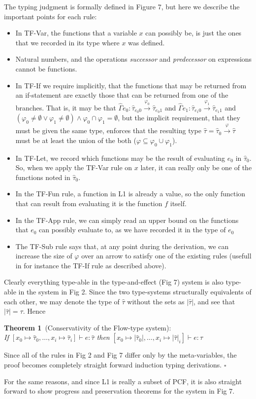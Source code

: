 The typing judgment  is formally defined
in Figure 7, but here we describe the important points for each rule:
\begin{itemize}
  \item In TF-Var, the functions that a variable $x$ can possibly be,
    is just the ones that we recorded in its type where $x$ was defined.
  \item Natural numbers, and the operations {\it successor} and {\it predecessor}
    on expressions cannot be functions.
  \item In TF-If we require implicitly, that the functions that may be returned
    from an if-statement are exactly those that can be returned from one of the
    branches. That is, it may be that
    $\hat\Gamma e_0 : \hat\tau_{e_{0}0} \xrightarrow{\varphi_0} \hat\tau_{e_{0}1}$ and
    $\hat\Gamma e_1 : \hat\tau_{e_{1}0} \xrightarrow{\varphi_1} \hat\tau_{e_{1}1}$ and
    $(\varphi_0 \neq \emptyset \lor \varphi_1 \neq \emptyset)
    \land \varphi_0 \cap \varphi_1 = \emptyset$,
    but the implicit requirement, that they must be given the same type,
    enforces that the resulting type
    $\hat\tau = \hat\tau_0 \xrightarrow{\varphi} \hat\tau$ must be at least
    the union of the both ($\varphi \subseteq \varphi_0 \cup \varphi_1$).
  \item In TF-Let, we record which functions may be the result of
    evaluating $e_0$ in $\hat\tau_0$. So, when we apply the TF-Var rule on $x$ later,
    it can really only be one of the functions noted in $\hat\tau_0$.
  \item In the TF-Fun rule, a function in L1 is already a value,
    so the only function that can result from evaluating it is the function
    $f$ itself.
  \item In the TF-App rule, we can simply read an upper bound on
    the functions that $e_0$ can possibly evaluate to, as we have recorded it
    in the type of $e_0$
  \item The TF-Sub rule says that, at any point during the derivation,
    we can increase the size of $\varphi$ over an arrow to satisfy one of the
    existing rules (usefull in for instance the TF-If rule as described above).
\end{itemize}

Clearly everything type-able in the type-and-effect (Fig 7) system is also type-able
in the system in Fig 2.
Since the two type-systems structurally equivalents of each other,
we may denote the type of $\hat\tau$ without the sets as $|\hat\tau|$,
and see that $|\hat\tau| = \tau$. Hence

{\bf Theorem 1}\ (Conservativity of the Flow-type system):\\
{\it If $[x_0 \mapsto \hat\tau_0, \dots, x_i \mapsto \hat\tau_i] \vdash e : \hat\tau$
then $[x_0 \mapsto |\hat\tau_0|, \dots, x_i \mapsto |\hat\tau|_i] \vdash e : \tau$}

Since all of the rules in Fig 2 and Fig 7 differ only by the meta-variables,
the proof becomes completely straight forward induction typing derivations.
\hfill$\square$

For the same reasons, and since L1 is really a subset of PCF,
it is also straight forward to show progress and preservation theorems
for the system in Fig 7.
